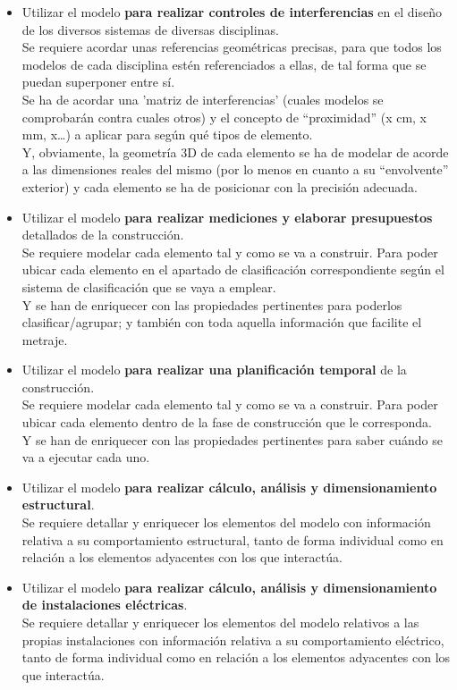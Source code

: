 \documentclass[spanish,12pt,a4paper,final,oneside]{book}
\begin{document}
\begin{itemize}
\item Utilizar el modelo \textbf{para realizar controles de interferencias} en el diseño de los diversos sistemas de diversas disciplinas.
\\Se requiere acordar unas referencias geométricas precisas, para que todos los modelos de cada disciplina estén referenciados a ellas, de tal forma que se puedan superponer entre sí.
\\Se ha de acordar una 'matriz de interferencias' (cuales modelos se comprobarán contra cuales otros) y el concepto de ``proximidad'' (x cm, x mm, x\ldots) a aplicar para según qué tipos de elemento.
\\Y, obviamente, la geometría 3D de cada elemento se ha de modelar de acorde a las dimensiones reales del mismo (por lo menos en cuanto a su ``envolvente'' exterior) y cada elemento se ha de posicionar con la precisión adecuada.

\item Utilizar el modelo \textbf{para realizar mediciones y elaborar presupuestos} detallados de la construcción.
\\Se requiere modelar cada elemento tal y como se va a construir. Para poder ubicar cada elemento en el apartado de clasificación correspondiente según el sistema de clasificación que se vaya a emplear. \\Y se han de enriquecer con las propiedades pertinentes para poderlos clasificar/agrupar; y también con toda aquella información que facilite el metraje. 
 
\item Utilizar el modelo \textbf{para realizar una planificación temporal} de la construcción.
\\Se requiere modelar cada elemento tal y como se va a construir. Para poder ubicar cada elemento dentro de la fase de construcción que le corresponda.
\\Y se han de enriquecer con las propiedades pertinentes para saber cuándo se va a ejecutar cada uno.

\item Utilizar el modelo \textbf{para realizar cálculo, análisis y dimensionamiento estructural}.
\\Se requiere detallar y enriquecer los elementos del modelo con información relativa a su comportamiento estructural, tanto de forma individual como en relación a los elementos adyacentes con los que interactúa.

\item Utilizar el modelo \textbf{para realizar cálculo, análisis y dimensionamiento de instalaciones eléctricas}.
\\Se requiere detallar y enriquecer los elementos del modelo relativos a las propias instalaciones con información relativa a su comportamiento eléctrico, tanto de forma individual como en relación a los elementos adyacentes con los que interactúa.


\end{itemize}
\end{document}

